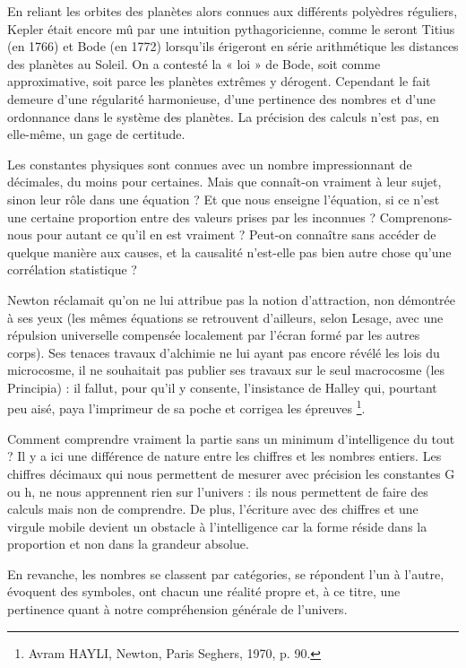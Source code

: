 \documentclass[a4paper,12pt]{article}
\begin{document}
En reliant les orbites des planètes alors connues aux différents polyèdres réguliers, Kepler était encore mû par une intuition pythagoricienne, comme le seront Titius (en 1766) et Bode (en 1772) lorsqu’ils érigeront en série arithmétique les distances des planètes au Soleil. On a contesté la « loi » de Bode, soit comme approximative, soit parce les planètes extrêmes y dérogent. Cependant le fait demeure d’une régularité harmonieuse, d’une pertinence des nombres et d’une ordonnance dans le système des planètes. La précision des calculs n'est pas, en elle-même, un gage de certitude. 

Les constantes physiques sont connues avec un nombre impressionnant de décimales, du moins pour certaines. Mais que connaît-on vraiment à leur sujet, sinon leur rôle dans une équation ? Et que nous enseigne l'équation, si ce n'est une certaine proportion entre des valeurs prises par les inconnues ? Comprenons-nous pour autant ce qu'il en est vraiment ? Peut-on connaître sans accéder de quelque manière aux causes, et la causalité n’est-elle pas bien autre chose qu’une corrélation statistique ? 

Newton réclamait qu'on ne lui attribue pas la notion d'attraction, non démontrée à ses yeux (les mêmes équations se retrouvent d’ailleurs, selon Lesage, avec une répulsion universelle compensée localement par l'écran formé par les autres corps). Ses tenaces travaux d’alchimie ne lui ayant pas encore révélé les lois du microcosme, il ne souhaitait pas publier ses travaux sur le seul macrocosme (les Principia) : il fallut, pour qu’il y consente, l’insistance de Halley qui, pourtant peu aisé, paya l’imprimeur de sa poche et corrigea les épreuves \footnote{Avram HAYLI, Newton, Paris Seghers, 1970, p. 90.}. 

Comment comprendre vraiment la partie sans un minimum d'intelligence du tout ? Il y a ici une différence de nature entre les chiffres et les nombres entiers. Les chiffres décimaux qui nous permettent de mesurer avec précision les constantes G ou h, ne nous apprennent rien sur l'univers : ils nous permettent de faire des calculs mais non de comprendre. De plus, l’écriture avec des chiffres et une virgule mobile devient un obstacle à l’intelligence car la forme réside dans la proportion et non dans la grandeur absolue. 

En revanche, les nombres se classent par catégories, se répondent l’un à l'autre, évoquent des symboles, ont chacun une réalité propre et, à ce titre, une pertinence quant à notre compréhension générale de l'univers.
\end{document}
